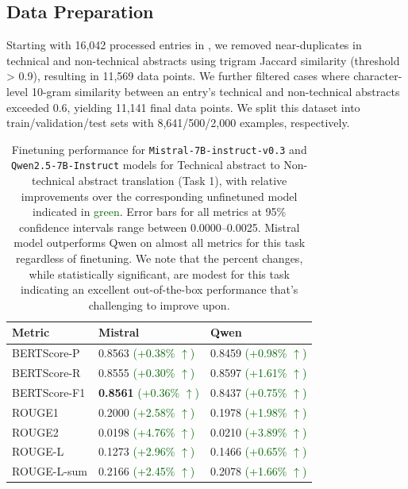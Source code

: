\documentclass[11pt]{article}
\begin{document}
\subsection{Data Preparation}

Starting with 16,042 processed entries in \DatasetNameMatSci, we removed near-duplicates in technical and non-technical abstracts using trigram Jaccard similarity (threshold > 0.9), resulting in 11,569 data points. We further filtered cases where character-level 10-gram similarity between an entry's technical and non-technical abstracts exceeded 0.6, yielding 11,141 final data points. We split this dataset into train/validation/test sets with 8,641/500/2,000 examples, respectively.

\begin{table}[t]
\centering
\small
\begin{tabular}{lll}
\toprule
Metric & Mistral & Qwen\\
\midrule
BERTScore-P & 0.8563 \textcolor{darkgreen}{(+0.38\% $\uparrow$)} & 0.8459 \textcolor{darkgreen}{(+0.98\% $\uparrow$)} \\
BERTScore-R    & 0.8555 \textcolor{darkgreen}{(+0.30\% $\uparrow$)} & 0.8597 \textcolor{darkgreen}{(+1.61\% $\uparrow$)} \\
BERTScore-F1        & \textbf{0.8561} \textcolor{darkgreen}{(+0.36\% $\uparrow$)} & 0.8437 \textcolor{darkgreen}{(+0.75\% $\uparrow$)} \\
ROUGE1              & 0.2000 \textcolor{darkgreen}{(+2.58\% $\uparrow$)} & 0.1978 \textcolor{darkgreen}{(+1.98\% $\uparrow$)} \\
ROUGE2              & 0.0198 \textcolor{darkgreen}{(+4.76\% $\uparrow$)} & 0.0210 \textcolor{darkgreen}{(+3.89\% $\uparrow$)} \\
ROUGE-L             & 0.1273 \textcolor{darkgreen}{(+2.96\% $\uparrow$)} & 0.1466 \textcolor{darkgreen}{(+0.65\% $\uparrow$)} \\
ROUGE-L-sum         & 0.2166 \textcolor{darkgreen}{(+2.45\% $\uparrow$)} & 0.2078 \textcolor{darkgreen}{(+1.66\% $\uparrow$)} \\
\bottomrule
\end{tabular}
\caption{Finetuning performance for \texttt{Mistral-7B-instruct-v0.3}
 and \texttt{Qwen2.5-7B-Instruct}
 models for Technical abstract to Non-technical abstract translation (Task 1), with relative improvements over the corresponding unfinetuned model indicated in \textcolor{darkgreen}{green}. Error bars for all metrics at 95\% confidence intervals range between 0.0000--0.0025. Mistral model outperforms Qwen on almost all metrics for this task regardless of finetuning. We note that the percent changes, while statistically significant, are modest for this task indicating an excellent out-of-the-box performance that's challenging to improve upon.}
\label{tab:eval_tech2nontech}
\end{table}
\end{document}
